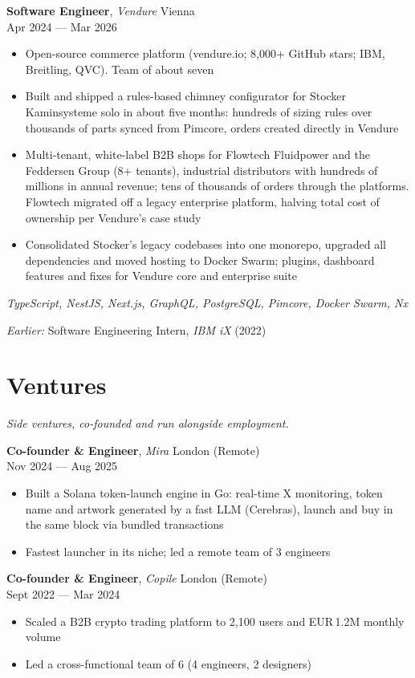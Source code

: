 \documentclass[a4paper,10pt]{article}
\newcommand{\entry}[4]{%
  \textbf{#1}, \textit{#2} \hfill #3 \\ \vspace{-2pt}
  {\small #4}%
}
\begin{document}
\vspace{3pt}
\entry{Software Engineer}{Vendure}{Vienna}{Apr 2024 --- Mar 2026}
\begin{itemize}
  \item Open-source commerce platform (vendure.io; 8,000+ GitHub stars; IBM, Breitling, QVC). Team of about seven
  \item Built and shipped a rules-based chimney configurator for Stocker Kaminsysteme solo in about five months: hundreds of sizing rules over thousands of parts synced from Pimcore, orders created directly in Vendure
  \item Multi-tenant, white-label B2B shops for Flowtech Fluidpower and the Feddersen Group (8+ tenants), industrial distributors with hundreds of millions in annual revenue; tens of thousands of orders through the platforms. Flowtech migrated off a legacy enterprise platform, halving total cost of ownership per Vendure's case study
  \item Consolidated Stocker's legacy codebases into one monorepo, upgraded all dependencies and moved hosting to Docker Swarm; plugins, dashboard features and fixes for Vendure core and enterprise suite
\end{itemize}
{\small\textit{TypeScript, NestJS, Next.js, GraphQL, PostgreSQL, Pimcore, Docker Swarm, Nx}}

\vspace{3pt}
{\small\textit{Earlier:} Software Engineering Intern, \textit{IBM iX} (2022)}

\section{Ventures}
\vspace{-1pt}
{\small\textit{Side ventures, co-founded and run alongside employment.}}
\vspace{3pt}

\entry{Co-founder \& Engineer}{Mira}{London (Remote)}{Nov 2024 --- Aug 2025}
\begin{itemize}
  \item Built a Solana token-launch engine in Go: real-time X monitoring, token name and artwork generated by a fast LLM (Cerebras), launch and buy in the same block via bundled transactions
  \item Fastest launcher in its niche; led a remote team of 3 engineers
\end{itemize}

\vspace{3pt}
\entry{Co-founder \& Engineer}{Copile}{London (Remote)}{Sept 2022 --- Mar 2024}
\begin{itemize}
  \item Scaled a B2B crypto trading platform to 2,100 users and EUR\,1.2M monthly volume
  \item Led a cross-functional team of 6 (4 engineers, 2 designers)
\end{itemize}
\end{document}
